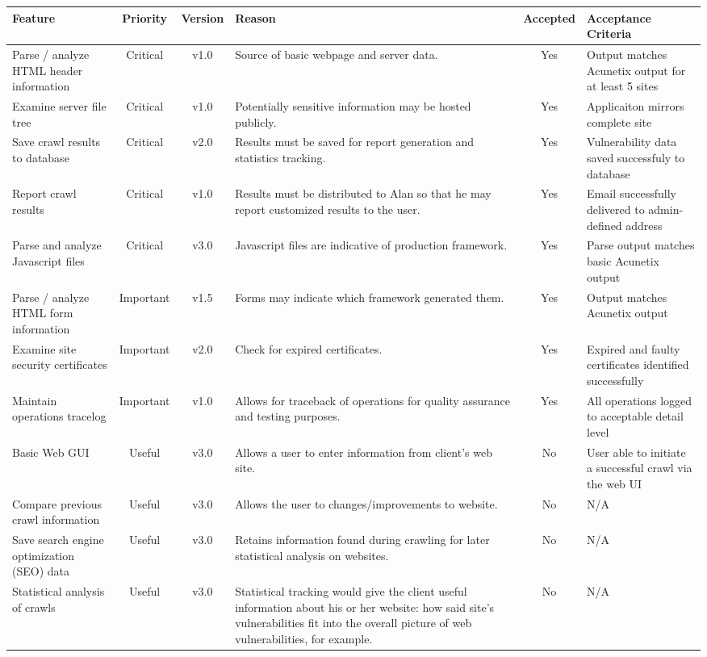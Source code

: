 \documentclass{article}
\begin{document}
\begin{tabularx}{\textwidth}{|X|c|c|X|c|p{3.5cm}|}
	\hline
	\bf Feature &\bf Priority &\bf Version &\bf Reason &\bf Accepted & \bf Acceptance Criteria\\ \hline
	Parse / analyze HTML header information & Critical & v1.0 & Source of basic webpage and server data. & Yes & Output matches Acunetix output for at least 5 sites\\ \hline
	Examine server file tree & Critical & v1.0 & Potentially sensitive information may be hosted publicly. & Yes & Applicaiton mirrors complete site\\ \hline
	Save crawl results to database & Critical &v2.0 & Results must be saved for report generation and statistics tracking. & Yes & Vulnerability data saved successfuly to database\\ \hline
	Report crawl results & Critical &v1.0 & Results must be distributed to Alan so that he may report customized results to the user. & Yes & Email successfully delivered to admin-defined address\\ \hline
	Parse and analyze Javascript files & Critical & v3.0 & Javascript files are indicative of production framework. & Yes & Parse output matches basic Acunetix output\\ \hline
	Parse / analyze HTML form information & Important & v1.5  & Forms may indicate which framework generated them. & Yes & Output matches Acunetix output\\ \hline
	Examine site security certificates & Important & v2.0 & Check for expired certificates. & Yes & Expired and faulty certificates identified successfully\\ \hline
	Maintain operations tracelog & Important & v1.0 & Allows for traceback of operations for quality assurance and testing purposes. & Yes & All operations logged to acceptable detail level\\ \hline
	Basic Web GUI & Useful & v3.0 & Allows a user to enter information from client's web site. & No & User able to initiate a successful crawl via the web UI\\ \hline
	Compare previous crawl information & Useful & v3.0 & Allows the user to changes/improvements to website. & No & N/A \\ \hline
	Save search engine optimization (SEO) data & Useful & v3.0 & Retains information found during crawling for later statistical analysis on websites. & No & N/A\\ \hline
	Statistical analysis of crawls & Useful & v3.0 & Statistical tracking would give the client useful information about his or her website: how said site's vulnerabilities fit into the overall picture of web vulnerabilities, for example. & No & N/A\\ \hline
\end{tabularx}
\end{document}
